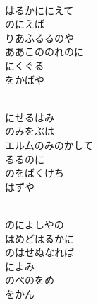\documentclass[10pt,b5j]{tarticle} %
\begin{document}
\vspace{1.5em} %
\newcommand{\linespace}{0.5em} %
\newcommand{\blocksize}{0.5\hsize} %
\newcommand{\itemmargin}{6em} %
\begin{enumerate} %
    \setlength{\itemindent}{\itemmargin} %
    \begin{minipage}[c]{\blocksize}
    
        \vspace{\linespace}
        \item~\\
        はるかににえて\\
        のにえば\\
        りあふるるのや\\
        ああこののれのに\\
        にくぐる\\
        をかばや
        
        \vspace{\linespace}
        \item~\\
        にせるはみ\\
        のみをぶは\\
        エルムのみのかして\\
        るるのに\\
        のをばくけち\\
        はずや
        
        \vspace{\linespace}
        \item~\\
        のによしやの\\
        はめどはるかに\\
        のはせぬなれば\\
        によみ\\
        のべのをめ\\
        をかん
        

\end{minipage}
\end{enumerate}
\end{document}
